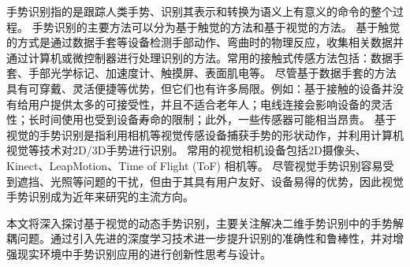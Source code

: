 手势识别指的是跟踪人类手势、识别其表示和转换为语义上有意义的命令的整个过程\cite{rautaray2015vision}。
手势识别的主要方法可以分为基于触觉的方法和基于视觉的方法\cite{oudah2020hand,rautaray2015vision}。
基于触觉的方式是通过数据手套等设备检测手部动作、弯曲时的物理反应，收集相关数据并通过计算机或微控制器进行处理识别的方法。常用的接触式传感方法包括：数据手套、手部光学标记、加速度计、触摸屏、表面肌电等\cite{oudah2020hand}。
尽管基于数据手套的方法具有可穿戴、灵活便捷等优势，但它们也有许多局限。例如：基于接触的设备并没有给用户提供太多的可接受性\cite{rautaray2015vision}，并且不适合老年人；电线连接会影响设备的灵活性；长时间使用也受到设备寿命的限制；此外，一些传感器可能相当昂贵\cite{oudah2020hand}。
基于视觉的手势识别是指利用相机等视觉传感设备捕获手势的形状动作，并利用计算机视觉等技术对2D/3D手势进行识别。
常用的视觉相机设备包括2D摄像头、Kinect、LeapMotion、Time of Flight (ToF) 相机等\cite{基于视觉的动态手势识别研究综述}。
尽管视觉手势识别容易受到遮挡、光照等问题的干扰，但由于其具有用户友好、设备易得的优势，因此视觉手势识别成为近年来研究的主流方向。

本文将深入探讨基于视觉的动态手势识别，主要关注解决二维手势识别中的手势解耦问题。通过引入先进的深度学习技术进一步提升识别的准确性和鲁棒性，并对增强现实环境中手势识别应用的进行创新性思考与设计。

